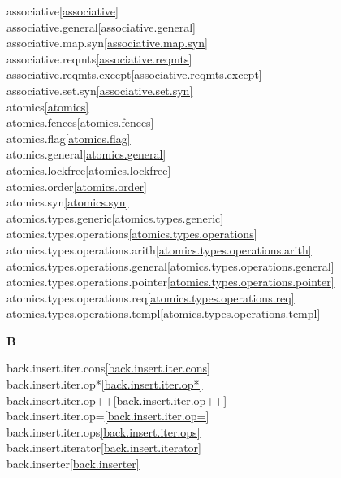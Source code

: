 \begin{multicols}{2}
associative\quad\ref{associative}\\
associative.general\quad\ref{associative.general}\\
associative.map.syn\quad\ref{associative.map.syn}\\
associative.reqmts\quad\ref{associative.reqmts}\\
associative.reqmts.except\quad\ref{associative.reqmts.except}\\
associative.set.syn\quad\ref{associative.set.syn}\\
atomics\quad\ref{atomics}\\
atomics.fences\quad\ref{atomics.fences}\\
atomics.flag\quad\ref{atomics.flag}\\
atomics.general\quad\ref{atomics.general}\\
atomics.lockfree\quad\ref{atomics.lockfree}\\
atomics.order\quad\ref{atomics.order}\\
atomics.syn\quad\ref{atomics.syn}\\
atomics.types.generic\quad\ref{atomics.types.generic}\\
atomics.types.operations\quad\ref{atomics.types.operations}\\
atomics.types.operations.arith\quad\ref{atomics.types.operations.arith}\\
atomics.types.operations.general\quad\ref{atomics.types.operations.general}\\
atomics.types.operations.pointer\quad\ref{atomics.types.operations.pointer}\\
atomics.types.operations.req\quad\ref{atomics.types.operations.req}\\
atomics.types.operations.templ\quad\ref{atomics.types.operations.templ}\\
\par \textbf{B}\par
back.insert.iter.cons\quad\ref{back.insert.iter.cons}\\
back.insert.iter.op*\quad\ref{back.insert.iter.op*}\\
back.insert.iter.op++\quad\ref{back.insert.iter.op++}\\
back.insert.iter.op=\quad\ref{back.insert.iter.op=}\\
back.insert.iter.ops\quad\ref{back.insert.iter.ops}\\
back.insert.iterator\quad\ref{back.insert.iterator}\\
back.inserter\quad\ref{back.inserter}\\

\end{multicols}
